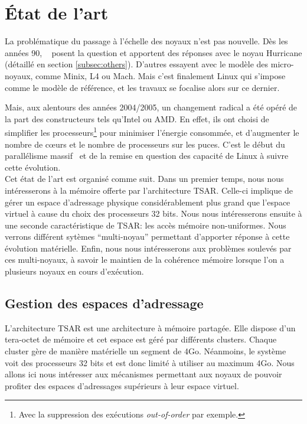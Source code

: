 \chapter{État de l’art}

  La problématique du passage à l’échelle des noyaux n’est pas nouvelle. Dès les
  années 90, ~\citeauthor{unrau1995hierarchical} posent la question et apportent
  des réponses avec le noyau Hurricane (détaillé en section
  \ref{subsec:others}). D’autres essayent avec le modèle des micro-noyaux, comme
  Minix, L4 ou Mach. Mais c'est finalement Linux qui s’impose comme le modèle de
  référence, et les travaux se focalise alors sur ce dernier.

  Mais, aux alentours des années 2004/2005, un changement radical a été opéré de
  la part des constructeurs tels qu’Intel ou AMD. En effet, ils ont choisi de
  simplifier les processeurs\footnote{Avec la suppression des exécutions
    \textit{out-of-order} par exemple.} pour minimiser l'énergie consommée, et
  d'augmenter le nombre de c\oe urs et le nombre de processeurs sur les
  puces. C'est le début du parallélisme massif~\citep{patterson2011parallel} et
  de la remise en question des capacité de Linux à suivre cette évolution.\\

  Cet état de l'art est organisé comme suit. Dans un premier temps, nous nous
  intéresserons à la mémoire offerte par l'architecture TSAR. Celle-ci implique
  de gérer un espace d'adressage physique considérablement plus grand que
  l'espace virtuel à cause du choix des processeurs 32 bits. Nous nous
  intéresserons ensuite à une seconde caractéristique de TSAR: les accès mémoire
  non-uniformes. Nous verrons différent sytèmes ``multi-noyau'' permettant
  d'apporter réponse à cette évolution matérielle. Enfin, nous nous
  intéresserons aux problèmes soulevés par ces multi-noyaux, à savoir le
  maintien de la cohérence mémoire lorsque l'on a plusieurs noyaux en cours
  d'exécution.


  \section{Gestion des espaces d'adressage}
  \label{sec:memory}    

    L'architecture TSAR est une architecture à mémoire partagée. Elle dispose
    d'un tera-octet de mémoire et cet espace est géré par différents
    clusters. Chaque cluster gère de manière matérielle un segment de
    4Go. Néanmoins, le système voit des processeurs 32 bits et est donc limité à
    utiliser au maximum 4Go. Nous allons ici nous intéresser aux mécanismes
    permettant aux noyaux de pouvoir profiter des espaces d'adressages
    supérieurs à leur espace virtuel.

